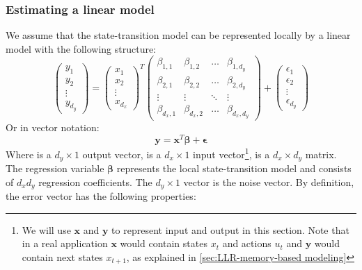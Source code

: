 \subsubsection{Estimating a linear model}\label{sec:LLR-linear model}
We assume that the state-transition model can be represented locally by a linear model with the following structure:
$$
	\left(\begin{array}{c} y_1 \\ y_2 \\ \vdots \\ y_{d_y} \end{array}\right) = 
	\left(\begin{array}{c} x_1 \\ x_2 \\ \vdots \\ x_{d_x} \end{array}\right)^T 
	\left(\begin{array}{cccc} 
		\beta_{1,1} 	& \beta_{1,2} 	& \hdots 	& \beta_{1,d_y} 	\\
		\beta_{2,1} 	& \beta_{2,2} 	& \hdots 	& \beta_{2,d_y} 	\\
		\vdots 				& \vdots 				& \ddots 	& \vdots 				\\
		\beta_{d_x,1} & \beta_{d_x,2} & \hdots 	& \beta_{d_x,d_y}
	\end{array}\right) + 
	\left(\begin{array}{c} \epsilon_1 \\ \epsilon_2 \\ \vdots \\ \epsilon_{d_y} \end{array}\right)
$$
Or in vector notation:
\begin{equation}
	\mathbf{y} = \mathbf{x}^T\bm{\beta} + \bm{\epsilon}
	\label{eqn:LLR-linear system}
\end{equation}
Where  is a $d_y \times 1$ output vector,  is a $d_x \times 1$ input vector\footnote{We will use $\mathbf{x}$ and $\mathbf{y}$ to represent input and output in this section. Note that in a real application $\mathbf{x}$ would contain states $x_t$ and actions $u_t$ and $\mathbf{y}$ would contain next states $x_{t+1}$, as explained in \ref{sec:LLR-memory-based modeling}},  is a $d_x \times d_y$ matrix. The regression variable $\bm{\beta}$ represents the local state-transition model and consists of $d_x d_y$ regression coefficients. The $d_y \times 1$ vector  is the noise vector. By definition, the error vector has the following properties:
